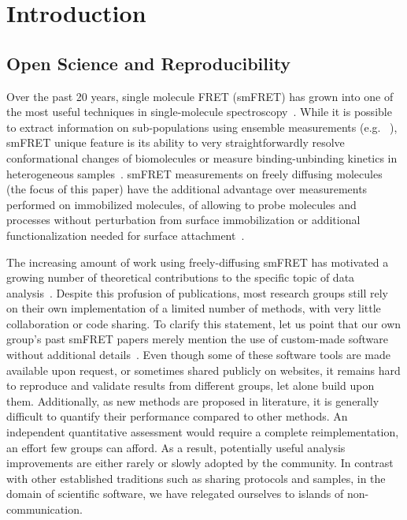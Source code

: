 \section{Introduction}

\subsection{Open Science and Reproducibility}

Over the past 20 years, single molecule FRET (smFRET) has grown into one of the most
useful techniques in single-molecule spectroscopy~\cite{Weiss_1999,Hohlbein_2014}.
While it is possible to extract information on sub-populations using ensemble measurements 
(e.g. ~\cite{Lerner_2014,Rahamim_2015}),
smFRET unique feature is its ability to very straightforwardly resolve conformational
changes of biomolecules or measure binding-unbinding kinetics in heterogeneous 
samples~\cite{Selvin_2000,Roy_2008,Schuler_2008,Sisamakis_2010,Haran_2012}.
smFRET measurements on freely diffusing molecules (the focus of this paper) 
have the additional advantage over measurements performed on immobilized molecules, 
of allowing to probe molecules and processes without perturbation from surface
immobilization or additional functionalization needed for surface 
attachment~\cite{Eggeling_1998,Dahan_1999}.

The increasing amount of work using freely-diffusing smFRET has motivated 
a growing number of theoretical contributions to the specific topic of data 
analysis~\cite{Fries_1998,Eggeling_2001,Zhang_2005,Gopich_2005,Lee_2005,Nir_2006,Antonik2006,Gopich_2007,Gopich_2008,Camley_2009,Santoso_2010,Torella_2011,Tomov_2012}. 
Despite this profusion of publications, most research groups still rely on 
their own implementation of a limited number of methods, with very little 
collaboration or code sharing. 
To clarify this statement, let us point that our own group's past smFRET papers 
merely mention the use of custom-made software without additional details~\cite{Lee_2005,Nir_2006}. 
Even though some of these software tools are made available upon request, 
or sometimes shared publicly on websites, 
it remains hard to reproduce and validate results from different groups, 
let alone build upon them.
Additionally, as new methods are proposed in literature,
it is generally difficult to quantify their performance compared to other methods.
An independent quantitative assessment
would require a complete reimplementation, an effort few groups can afford.
As a result, potentially useful analysis improvements
are either rarely or slowly adopted by the community.
In contrast with other established traditions such as
sharing protocols and samples, in the domain of scientific software,
we have relegated ourselves to islands of non-communication.

